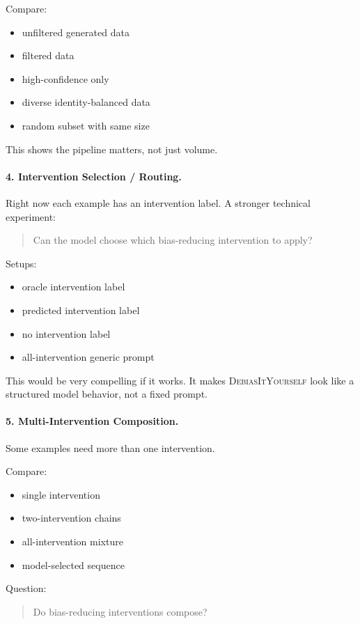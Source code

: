 \documentclass[11pt]{article}
\newcommand{\diy}{\textsc{DebiasItYourself}}
\begin{document}
Compare:
\begin{itemize}[leftmargin=1.4em,itemsep=1pt,topsep=2pt]
    \item unfiltered generated data
    \item filtered data
    \item high-confidence only
    \item diverse identity-balanced data
    \item random subset with same size
\end{itemize}
This shows the pipeline matters, not just volume.

\paragraph{4. Intervention Selection / Routing.}
Right now each example has an intervention label. A stronger technical experiment:

\begin{quote}
Can the model choose which bias-reducing intervention to apply?
\end{quote}

Setups:
\begin{itemize}[leftmargin=1.4em,itemsep=1pt,topsep=2pt]
    \item oracle intervention label
    \item predicted intervention label
    \item no intervention label
    \item all-intervention generic prompt
\end{itemize}
This would be very compelling if it works. It makes \diy{} look like a structured model behavior, not a fixed prompt.

\paragraph{5. Multi-Intervention Composition.}
Some examples need more than one intervention.

Compare:
\begin{itemize}[leftmargin=1.4em,itemsep=1pt,topsep=2pt]
    \item single intervention
    \item two-intervention chains
    \item all-intervention mixture
    \item model-selected sequence
\end{itemize}

Question:
\begin{quote}
Do bias-reducing interventions compose?
\end{quote}
\end{document}
